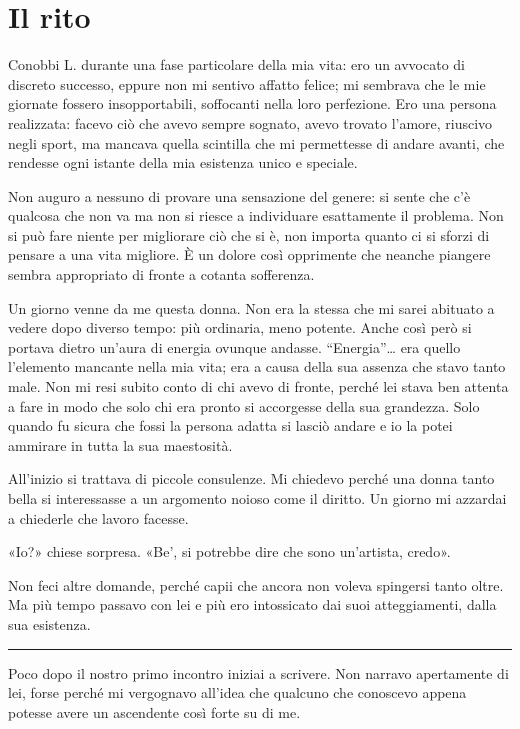 \chapter{Il rito}
\label{ch:il-rito}

Conobbi L. durante una fase particolare della mia vita: ero un avvocato di discreto successo, eppure
non mi sentivo affatto felice; mi sembrava che le mie giornate fossero insopportabili, soffocanti
nella loro perfezione. Ero una persona realizzata: facevo ciò che avevo sempre sognato, avevo
trovato l'amore, riuscivo negli sport, ma mancava quella scintilla che mi permettesse di andare
avanti, che rendesse ogni istante della mia esistenza unico e speciale.

Non auguro a nessuno di provare una sensazione del genere: si sente che c'è qualcosa che non va ma
non si riesce a individuare esattamente il problema. Non si può fare niente per migliorare ciò che
si è, non importa quanto ci si sforzi di pensare a una vita migliore. È un dolore così opprimente
che neanche piangere sembra appropriato di fronte a cotanta sofferenza.

Un giorno venne da me questa donna. Non era la stessa che mi sarei abituato a vedere dopo diverso
tempo: più ordinaria, meno potente. Anche così però si portava dietro un'aura di energia ovunque
andasse. ``Energia''\dots{} era quello l'elemento mancante nella mia vita; era a causa della sua
assenza che stavo tanto male. Non mi resi subito conto di chi avevo di fronte, perché lei stava ben
attenta a fare in modo che solo chi era pronto si accorgesse della sua grandezza. Solo quando fu
sicura che fossi la persona adatta si lasciò andare e io la potei ammirare in tutta la sua
maestosità.

All'inizio si trattava di piccole consulenze. Mi chiedevo perché una donna tanto bella si
interessasse a un argomento noioso come il diritto. Un giorno mi azzardai a chiederle che lavoro
facesse.

«Io?» chiese sorpresa. «Be', si potrebbe dire che sono un'artista, credo».

Non feci altre domande, perché capii che ancora non voleva spingersi tanto oltre. Ma più tempo
passavo con lei e più ero intossicato dai suoi atteggiamenti, dalla sua esistenza.

\plainbreak{1}

Poco dopo il nostro primo incontro iniziai a scrivere. Non narravo apertamente di lei, forse perché
mi vergognavo all'idea che qualcuno che conoscevo appena potesse avere un ascendente così forte su
di me.

